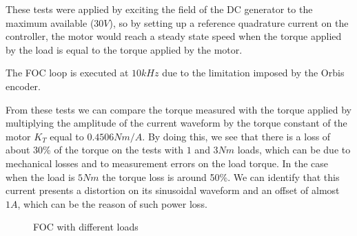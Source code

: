 These tests were applied by exciting the field of the \ac{DC} generator to the maximum available ($30V$), so by setting up a reference quadrature current on the controller, the motor would reach a steady state speed when the torque applied by the load is equal to the torque applied by the motor.

The \ac{FOC} loop is executed at $10kHz$ due to the limitation imposed by the Orbis encoder.

From these tests we can compare the torque measured with the torque applied by multiplying the amplitude of the current waveform by the torque constant of the motor $K_{T}$ equal to $0.4506 Nm/A$. By doing this, we see that there is a loss of about 30\% of the torque on the tests with $1$ and $3 Nm$ loads, which can be due to mechanical losses and to measurement errors on the load torque. In the case when the load is $5 Nm$ the torque loss is around 50\%. We can identify that this current presents a distortion on its sinusoidal waveform and an offset of almost $1A$, which can be the reason of such power loss.

\begin{figure}[h!p]
\centering
\hfill

\caption{FOC with different loads}
\end{figure}

